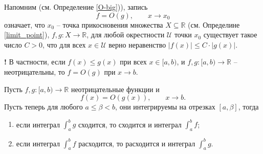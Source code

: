 Напомним (см. Определение \ref{O-big})), запись 
$$f=O(g),\qquad x \to x_0$$
означает, что $x_0$ -- точка прикосновения множества $X\subseteq \mathbb{R}$ (см. Определине \ref{limit_point}), $f,g: X \to \mathbb{R}$, для любой окрестности $\mathscr{U}$ точки $x_0$ существует такое число $C>0$, что для всех $x \in \mathscr{U}$ верно неравенство $|f(x)| \le C \cdot |g(x)|$.

\begin{mydanger}{\bf !}
В частности, если $f(x) \le g(x)$ при всех $x \in [a,b)$, и $f,g:[a,b) \to \mathbb{R}$ -- неотрицательны, то $f = O(g)$ при $x \to b.$    
\end{mydanger}




\begin{theorem}
    Пусть $f,g:[a,b) \to \mathbb{R}$ неотрицательные функции и
    \[
     f(x) = O(g(x)), \qquad x \to b.
    \]
Пусть теперь для любого $a\le \beta <b$, они интегрируемы на отрезках $[a,\beta]$, тогда
    \begin{enumerate}
        \item если интеграл $\int_a^b g$ сходится, то сходится и интеграл $\int_a^b f$;
        \item если интеграл $\int_a^b f$ расходится, то расходится и интеграл $\int_a^b g.$
    \end{enumerate}
\end{theorem}

